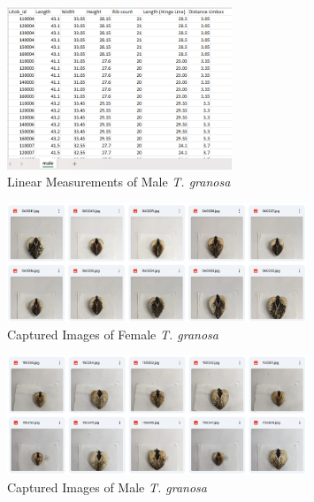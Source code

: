 \begin{figure}[!htbp]
	\centering
	\includegraphics[width=0.6\textwidth]{figures/male_dataset.png}
	\caption{Linear Measurements of Male \textit{T. granosa}}
\end{figure}

\begin{figure}[!htbp]
	\centering
	\includegraphics[width=0.8\textwidth]{figures/female_dataset(img).png}
	\caption{Captured Images of Female \textit{T. granosa}}
\end{figure}

\begin{figure}[!htbp]
	\centering
	\includegraphics[width=0.8\textwidth]{figures/male_dataset(img).png}
	\caption{Captured Images of Male \textit{T. granosa}}
\end{figure}

